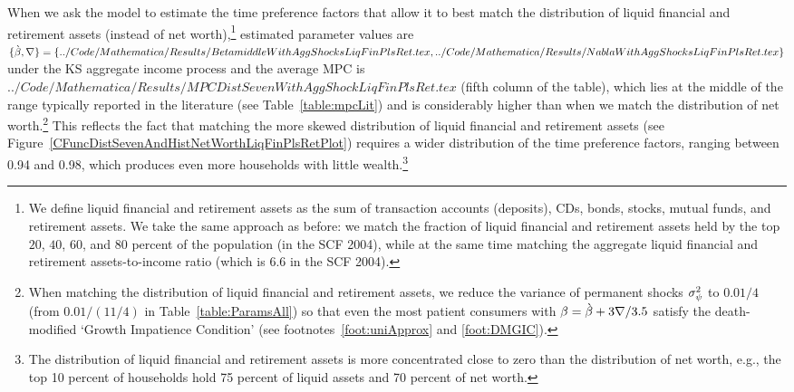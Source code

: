 \documentclass[12pt,titlepage]{econtex}
\begin{document}
When we ask the model to estimate the time preference factors that
allow it to best match the distribution of liquid financial and retirement assets (instead
of net worth),\footnote{We define liquid financial and retirement assets as the sum of transaction accounts (deposits),
CDs, bonds, stocks, mutual funds, and retirement assets.  We take the same approach as before: we match
  the fraction of liquid financial and retirement assets held by the top $20$, $40$, $60$,
  and $80$ percent of the population (in the SCF 2004), while at the
  same time matching the aggregate liquid financial and retirement assets-to-income ratio (which is 6.6 in the SCF 2004).}
estimated parameter values are
$\{\grave{\beta}, \nabla\}=\{
../Code/Mathematica/Results/BetamiddleWithAggShocksLiqFinPlsRet.tex ,
../Code/Mathematica/Results/NablaWithAggShocksLiqFinPlsRet.tex \}
$
under the KS aggregate income process and the average MPC is
$
../Code/Mathematica/Results/MPCDistSevenWithAggShockLiqFinPlsRet.tex
$ (fifth column of the table), which lies at the middle of the
range typically reported in the literature (see
Table~\ref{table:mpcLit}) and is considerably higher than when we
match the distribution of net worth.\footnote{When matching the distribution of liquid financial and retirement assets, we reduce the variance of permanent shocks $\sigma _{\psi}^{2}$ to $0.01/4$ (from $0.01/(11/4)$ in Table~\ref{table:ParamsAll}) so that even the most patient consumers with  $\beta=\grave{\beta}+3\nabla/3.5$ satisfy the death-modified `Growth Impatience Condition' (see footnotes~\ref{foot:uniApprox} and \ref{foot:DMGIC}).} This reflects the fact that
matching the more skewed distribution of liquid financial and
retirement assets
(see
Figure~\ref{CFuncDistSevenAndHistNetWorthLiqFinPlsRetPlot}) requires
a wider distribution of the time preference factors, ranging between
0.94 and 0.98, which produces even more
households with little wealth.\footnote{The distribution of liquid financial and retirement assets is more concentrated close to zero than the distribution of net worth, e.g., the top 10 percent of households hold 75 percent of liquid assets and 70 percent of net worth.
}
\end{document}
